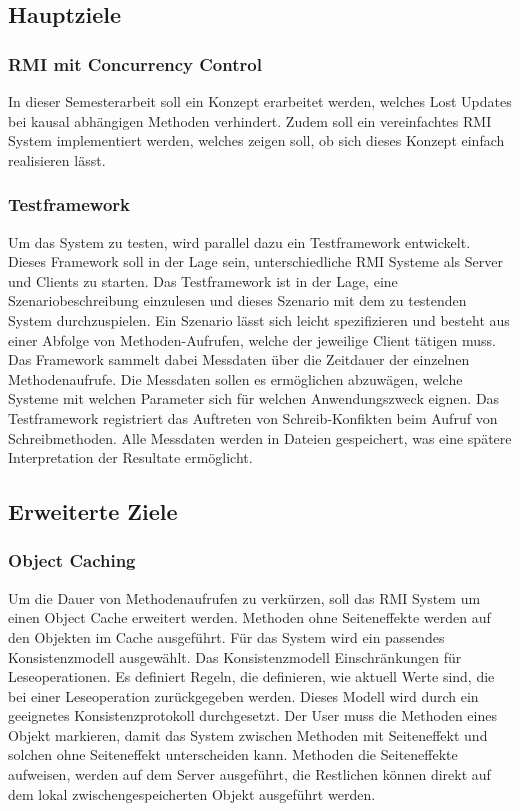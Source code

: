 \documentclass{article}
\begin{document}
\subsection{Hauptziele}
\label{sec:hauptziele}

\subsubsection{RMI mit Concurrency Control}
\label{sec:rmi-mit-concurrency}

In dieser Semesterarbeit soll ein Konzept erarbeitet werden, welches Lost Updates bei kausal abhängigen Methoden verhindert.  Zudem soll ein vereinfachtes RMI System implementiert werden, welches zeigen soll, ob sich dieses Konzept einfach realisieren lässt.

\subsubsection{Testframework}
\label{sec:testframework}

Um das System zu testen, wird parallel dazu ein Testframework entwickelt. Dieses Framework soll in der Lage sein, unterschiedliche RMI Systeme als Server und Clients zu starten. Das Testframework ist in der Lage, eine Szenariobeschreibung einzulesen und dieses Szenario mit dem zu testenden System durchzuspielen. Ein Szenario lässt sich leicht spezifizieren und besteht aus einer Abfolge von Methoden-Aufrufen, welche der jeweilige Client tätigen muss. Das Framework sammelt dabei Messdaten über die Zeitdauer der einzelnen Methodenaufrufe. Die Messdaten sollen es ermöglichen abzuwägen, welche Systeme mit welchen Parameter sich für welchen Anwendungszweck eignen. Das Testframework registriert das Auftreten von Schreib-Konfikten beim Aufruf von Schreibmethoden. Alle Messdaten werden in Dateien gespeichert, was eine spätere Interpretation der Resultate ermöglicht.

\subsection{Erweiterte Ziele}
\label{sec:erweiterte-ziele}

\subsubsection{Object Caching}
\label{sec:object-caching}

Um die Dauer von Methodenaufrufen zu verkürzen, soll das RMI System um
einen Object Cache erweitert werden. Methoden ohne Seiteneffekte
werden auf den Objekten im Cache ausgeführt. Für das System wird ein
passendes Konsistenzmodell ausgewählt. Das Konsistenzmodell
Einschränkungen für Leseoperationen. Es definiert Regeln, die
definieren, wie aktuell Werte sind, die bei einer Leseoperation
zurückgegeben werden. Dieses Modell wird durch ein geeignetes Konsistenzprotokoll durchgesetzt. Der User muss die Methoden eines Objekt markieren, damit das System zwischen Methoden mit Seiteneffekt und solchen ohne Seiteneffekt unterscheiden kann. Methoden die Seiteneffekte aufweisen, werden auf dem Server ausgeführt, die Restlichen können direkt auf dem lokal zwischengespeicherten Objekt ausgeführt werden.
\end{document}
